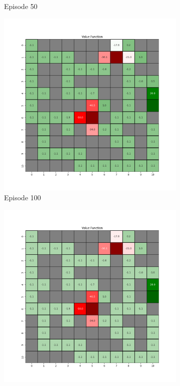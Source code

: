 \documentclass{assignment}
\begin{document}
\begin{figure}[H]
\begin{subfigure}{0.3\textwidth}
    \caption{Episode 50}
    \end{subfigure}\hfill
    \begin{subfigure}{0.3\textwidth}
        \includegraphics[width=\textwidth]{figures/value_td/gamma_sweep/value_function_alpha_0.1_gamma_0.1_epsilon_0.2_iteration_100.png}
    \caption{Episode 100}
    \end{subfigure}
    \begin{subfigure}{0.3\textwidth}
        \includegraphics[width=\textwidth]{figures/value_td/gamma_sweep/value_function_alpha_0.1_gamma_0.1_epsilon_0.2_iteration_1000.png}

\end{subfigure}
\end{figure}
\end{document}
